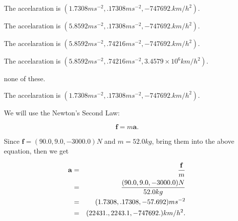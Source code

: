 \documentclass[12pt]{article}
\begin{document}
 
 
The accelaration is
$(
1.7308ms^{-2},
.17308ms^{-2},
-747692.km/h^2
).
$
 
 
The accelaration is
$(
5.8592ms^{-2},
.17308ms^{-2},
-747692.km/h^2
).
$
 
 
The accelaration is
$(
5.8592ms^{-2},
.74216ms^{-2},
-747692.km/h^2
).
$
 
 
The accelaration is
$(
5.8592ms^{-2},
.74216ms^{-2},
3.4579 \times 10^{6}km/h^2
).
$
 
 
none of these.
 
 
\noindent{}
 
 
The accelaration is
$(
1.7308ms^{-2},
.17308ms^{-2},
-747692.km/h^2
).
$
 
 
\noindent{}
 
 
 
 
 
 
\noindent{}
 
 

We will use the Newton's Second Law:
 
\[
\mathbf{f}=m\mathbf{a}.
\]
 
Since $\mathbf{f}=( %
90.0,  %
9.0,  %
-3000.0 )N$
and $m= %
52.0kg$, bring them into the above equation, then we get
 
\begin{eqnarray*}
\mathbf{a}&=&\frac{\mathbf{f}}m  \\
&=&\frac{(
90.0 ,
9.0 ,
-3000.0 )N
}{ %
52.0 kg}  \\
&=&(
1.7308 ,
.17308,
-57.692
)ms^{-2} \\
&=&(
22431. ,
2243.1 ,
-747692.
)km/h^2.
\end{eqnarray*}
 
 
 
\noindent{}
 
 

 
\vspace{0.3in}
   
   
   
\end{document}
